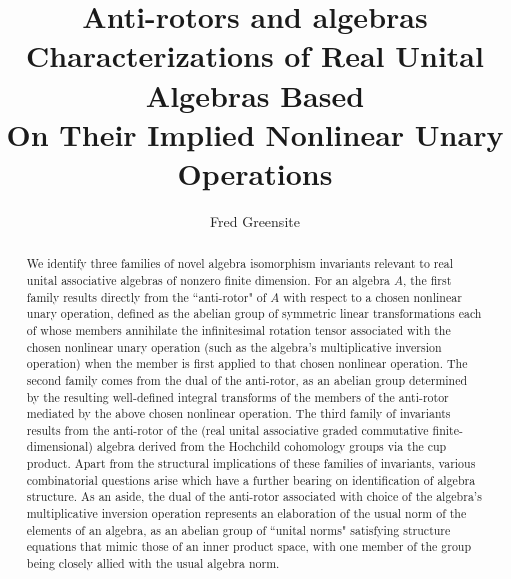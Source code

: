\documentclass{amsart}
\numberwithin{equation}{section}
\theoremstyle{definition}
\numberwithin{theorem}{section}
\begin{document}
       
             \title{Anti-rotors and algebras \\     C\MakeLowercase{haracterizations of} R\MakeLowercase{eal} U\MakeLowercase{nital} A\MakeLowercase{lgebras} B\MakeLowercase{ased} \\O\MakeLowercase{n}  T\MakeLowercase{heir} I\MakeLowercase{mplied} N\MakeLowercase{onlinear} U\MakeLowercase{nary} O\MakeLowercase{perations}
}
             
    \author{Fred Greensite}
    
   \begin{abstract}  We identify three families of novel algebra isomorphism invariants relevant to real unital associative algebras of nonzero finite dimension.  For an algebra $A$, the first family results directly from the ``anti-rotor" of $A$ with respect to a chosen nonlinear unary operation, defined as the abelian group of symmetric linear transformations each of whose members  annihilate the infinitesimal rotation tensor associated with the chosen nonlinear unary operation (such as the algebra's multiplicative inversion operation) when the member is first applied to that chosen nonlinear operation.  The second family comes from the dual of the anti-rotor, as an abelian group determined by the resulting well-defined integral transforms of the members of the anti-rotor mediated by the above chosen nonlinear operation.  The third family of invariants results from the anti-rotor of the (real unital associative graded commutative finite-dimensional) algebra derived from the Hochchild cohomology groups via the cup product.  
  Apart from the structural implications of these families of invariants, various combinatorial questions arise which have a further bearing on identification of algebra structure.  As an aside, the dual of the anti-rotor associated with choice of the algebra's multiplicative inversion operation represents an elaboration of the usual norm of the elements of an algebra, as an abelian group of ``unital norms" satisfying structure equations that mimic those of an inner product space, with one member of the group being closely allied with the usual algebra norm. \end{abstract}
        
  \maketitle

  
\end{document}
